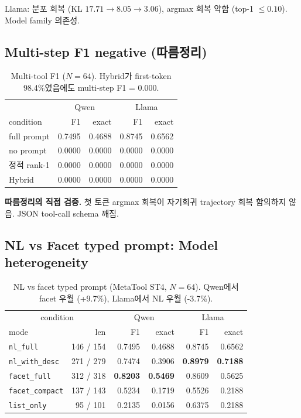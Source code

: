 \documentclass[11pt]{article}
\theoremstyle{definition}
\begin{document}
Llama: 분포 회복 (KL $17.71\to 8.05\to 3.06$), argmax 회복 약함 (top-1 $\le 0.10$). Model family 의존성.

\subsection{Multi-step F1 negative (따름정리)}
\label{sec:exp-multistep}

\begin{table}[h]
\centering
\caption{Multi-tool F1 ($N=64$). Hybrid가 first-token 98.4\%였음에도 multi-step F1 = 0.000.}
\label{tab:multistep}
\small
\begin{tabular}{lrrrr}
\toprule
& \multicolumn{2}{c}{Qwen} & \multicolumn{2}{c}{Llama} \\
condition & F1 & exact & F1 & exact \\
\midrule
full prompt & 0.7495 & 0.4688 & 0.8745 & 0.6562 \\
no prompt   & 0.0000 & 0.0000 & 0.0000 & 0.0000 \\
정적 rank-1 & 0.0000 & 0.0000 & 0.0000 & 0.0000 \\
Hybrid      & 0.0000 & 0.0000 & 0.0000 & 0.0000 \\
\bottomrule
\end{tabular}
\end{table}

\textbf{따름정리의 직접 검증.} 첫 토큰 argmax 회복이 자기회귀 trajectory 회복 함의하지 않음. JSON tool-call schema 깨짐.

\subsection{NL vs Facet typed prompt: Model heterogeneity}
\label{sec:exp-facet-nl}

\begin{table}[h]
\centering
\caption{NL vs facet typed prompt (MetaTool ST4, $N=64$). Qwen에서 facet 우월 (+9.7\%), Llama에서 NL 우월 (-3.7\%).}
\label{tab:facet-nl}
\small
\begin{tabular}{lrrrrr}
\toprule
\multicolumn{2}{c}{condition} & \multicolumn{2}{c}{Qwen} & \multicolumn{2}{c}{Llama} \\
mode & len & F1 & exact & F1 & exact \\
\midrule
\texttt{nl\_full}        & 146 / 154 & 0.7495 & 0.4688 & 0.8745 & 0.6562 \\
\texttt{nl\_with\_desc}  & 271 / 279 & 0.7474 & 0.3906 & \textbf{0.8979} & \textbf{0.7188} \\
\texttt{facet\_full}     & 312 / 318 & \textbf{0.8203} & \textbf{0.5469} & 0.8609 & 0.5625 \\
\texttt{facet\_compact}  & 137 / 143 & 0.5234 & 0.1719 & 0.5526 & 0.2188 \\
\texttt{list\_only}      &  95 / 101 & 0.2135 & 0.0156 & 0.6375 & 0.2188 \\
\bottomrule
\end{tabular}
\end{table}
\end{document}
